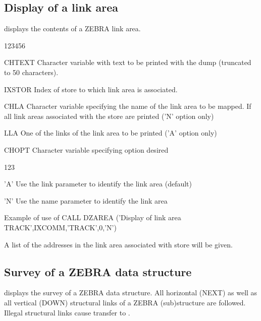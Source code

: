 \newpage
\subsection{Display of a link area}


\Action {} displays the contents of a ZEBRA link area.

\begin{DLtt}{123456}
\item[CHTEXT]Character variable with text to be printed with the
dump (truncated to 50 characters).
\item[IXSTOR]Index of store to which link area is associated.
\item[CHLA]Character variable specifying the name of the link area to be mapped.
\newline If  all link areas associated with the store are printed
('N' option only)
\item[LLA]One of the links of the link area to be printed ('A' option only)
\item[CHOPT]Character variable specifying option desired
\begin{DLtt}{123}
\item['A']Use the link parameter  to identify the link area (default)
\item['N']Use the name parameter  to identify the link area
\end{DLtt}
\end{DLtt}

\begin{XMPt}{Example of use of }
      CALL DZAREA ('Display of link area TRACK',IXCOMM,'TRACK',0,'N')
\end{XMPt}
A list of the addresses in the link area  associated
with store  will be given.

\subsection{Survey of a ZEBRA data structure}


\Action
{} displays the survey of a ZEBRA data structure.
All horizontal (NEXT) as well as all vertical (DOWN) structural
links of a ZEBRA (sub)structure are followed.
Illegal structural links cause transfer to .

